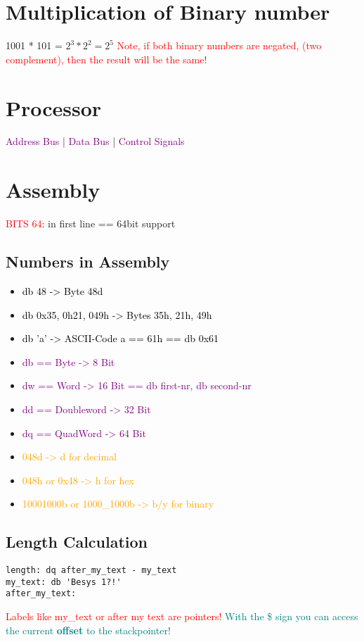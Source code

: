 \documentclass[main.tex,fontsize=8pt,paper=a4,paper=landscape,DIV=calc,]{scrartcl}
\begin{document}
\begin{multicols*}{4}


\section{Multiplication of Binary number}
1001 * 101 = \(2^3 * 2^2 = 2^5\)\newline
\textcolor{red}{Note, if both binary numbers are negated, (two complement), then the result will be the same!}

\section{Processor}
\textcolor{purple}{Address Bus} |
\textcolor{purple}{Data Bus} |
\textcolor{purple}{Control Signals}

\section{Assembly}
\textcolor{red}{BITS 64}: in first line == 64bit support

\subsection{Numbers in Assembly}
\begin{itemize}
\item \textcolor{black}{db 48 -> Byte 48d}
\item \textcolor{black}{db 0x35, 0h21, 049h -> Bytes 35h, 21h, 49h}
\item \textcolor{black}{db 'a' -> ASCII-Code a == 61h == db 0x61}
\item \textcolor{purple}{db == Byte -> 8 Bit}
\item \textcolor{purple}{dw == Word -> 16 Bit == db first-nr, db second-nr}
\item \textcolor{purple}{dd == Doubleword -> 32 Bit}
\item \textcolor{purple}{dq == QuadWord -> 64 Bit}
\item \textcolor{orange}{048d -> d for decimal}
\item \textcolor{orange}{048h or 0x48 -> h for hex}
\item \textcolor{orange}{10001000b or 1000\_1000b -> b/y for binary}
\end{itemize}
\subsection{Length Calculation}
\vspace{-2.5mm}
\begin{lstlisting}
length: dq after_my_text - my_text
my_text: db 'Besys 1?!'
after_my_text:
\end{lstlisting}
\vspace{2mm}
\textcolor{red}{Labels like my\_text or after my text are pointers!}\newline
\textcolor{teal}{With the \$ sign you can access the current \textbf{offset} to the stackpointer!}


\end{multicols*}
\end{document}
